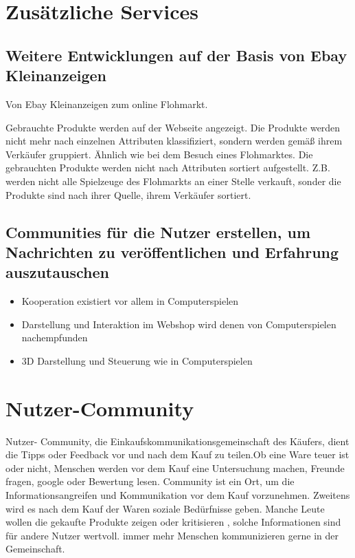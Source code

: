\section{Zusätzliche Services}


\subsection{Weitere Entwicklungen auf der Basis von Ebay Kleinanzeigen}

Von Ebay Kleinanzeigen zum online Flohmarkt.

Gebrauchte Produkte werden auf der Webseite angezeigt. Die Produkte werden nicht mehr nach einzelnen Attributen klassifiziert, sondern werden gemäß ihrem Verkäufer gruppiert. Ähnlich wie bei dem Besuch eines Flohmarktes. Die gebrauchten Produkte werden nicht nach Attributen sortiert aufgestellt. Z.B. werden nicht alle Spielzeuge des Flohmarkts an einer Stelle verkauft, sonder die Produkte sind nach ihrer Quelle, ihrem Verkäufer sortiert.


\subsection{Communities  für die Nutzer erstellen, um Nachrichten zu veröffentlichen und Erfahrung auszutauschen}

\begin{itemize}
\item Kooperation existiert vor allem in Computerspielen
\item Darstellung und Interaktion im Webshop wird denen von Computerspielen nachempfunden
\item 3D Darstellung und Steuerung wie in Computerspielen
\end{itemize}


\section{Nutzer-Community}

Nutzer- Community,  die Einkaufskommunikationsgemeinschaft des Käufers, dient die Tipps oder Feedback vor und nach dem Kauf zu teilen.Ob eine Ware teuer ist oder nicht, Menschen werden vor dem Kauf eine Untersuchung machen, Freunde fragen, google oder  Bewertung lesen.  Community ist ein Ort, um die Informationsangreifen und Kommunikation vor dem Kauf vorzunehmen. Zweitens wird es nach dem Kauf der Waren soziale Bedürfnisse geben. Manche Leute wollen die gekaufte Produkte zeigen oder kritisieren , solche Informationen sind für andere Nutzer wertvoll.  immer mehr Menschen kommunizieren gerne in der Gemeinschaft.

